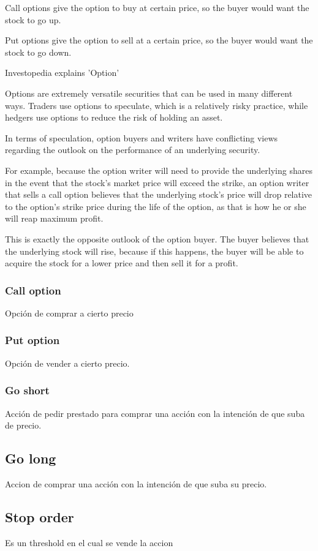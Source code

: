         Call options give the option to buy at certain price, so the buyer would want the stock to go up.

        Put options give the option to sell at a certain price, so the buyer would want the stock to go down.
        
        Investopedia explains 'Option'

        Options are extremely versatile securities that can be used in many different ways. Traders use options to speculate, which is a relatively risky practice, while hedgers use options to reduce the risk of holding an asset.

        In terms of speculation, option buyers and writers have conflicting views regarding the outlook on the performance of an underlying security.

        For example, because the option writer will need to provide the underlying shares in the event that the stock's market price will exceed the strike, an option writer that sells a call option believes that the underlying stock's price will drop relative to the option's strike price during the life of the option, as that is how he or she will reap maximum profit.

        This is exactly the opposite outlook of the option buyer. The buyer believes that the underlying stock will rise, because if this happens, the buyer will be able to acquire the stock for a lower price and then sell it for a profit.
        
            \subsubsection{ Call option }
        
                Opción de comprar a cierto precio
        
            \subsubsection{ Put option }
        
                Opción de vender a cierto precio.
        
            \subsubsection{ Go short }
        
                Acción de pedir prestado para comprar una acción con la intención de que suba de precio.
        
        \subsection{ Go long }
        
            Accion de comprar una acción con la intención de que suba su precio.
        
        \subsection{ Stop order }
        
            Es un threshold en el cual se vende la accion
            
        

\blindtext